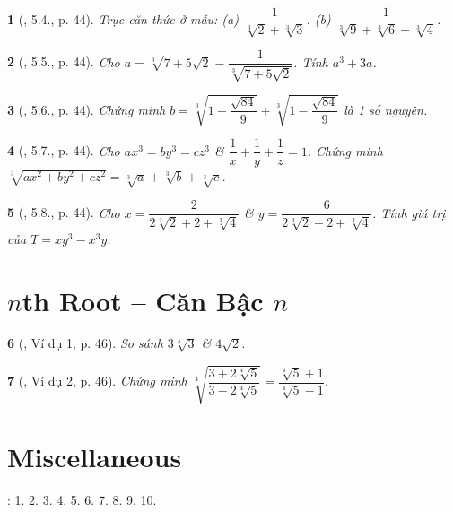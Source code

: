 \documentclass{article}
\newtheorem{baitoan}{}%
\begin{document}
\begin{baitoan}[\cite{Binh_boi_duong_Toan_9_tap_1}, 5.4., p. 44]
	Trục căn thức ở mẫu: (a) $\dfrac{1}{\sqrt[3]{2} + \sqrt[3]{3}}$. (b) $\dfrac{1}{\sqrt[3]{9} + \sqrt[3]{6} + \sqrt[3]{4}}$.
\end{baitoan}

\begin{baitoan}[\cite{Binh_boi_duong_Toan_9_tap_1}, 5.5., p. 44]
	Cho $a = \sqrt[3]{7 + 5\sqrt{2}} - \dfrac{1}{\sqrt[3]{7 + 5\sqrt{2}}}$. Tính $a^3 + 3a$.
\end{baitoan}

\begin{baitoan}[\cite{Binh_boi_duong_Toan_9_tap_1}, 5.6., p. 44]
	Chứng minh $b = \sqrt[3]{1 + \dfrac{\sqrt{84}}{9}} + \sqrt[3]{1 - \dfrac{\sqrt{84}}{9}}$ là 1 số nguyên.
\end{baitoan}

\begin{baitoan}[\cite{Binh_boi_duong_Toan_9_tap_1}, 5.7., p. 44]
	Cho $ax^3 = by^3 = cz^3$ \& $\dfrac{1}{x} + \dfrac{1}{y} + \dfrac{1}{z} = 1$. Chứng minh $\sqrt[3]{ax^2 + by^2 + cz^2} = \sqrt[3]{a} + \sqrt[3]{b} + \sqrt[3]{c}$.
\end{baitoan}

\begin{baitoan}[\cite{Binh_boi_duong_Toan_9_tap_1}, 5.8., p. 44]
	Cho $x = \dfrac{2}{2\sqrt[3]{2} + 2 + \sqrt[3]{4}}$ \& $y = \dfrac{6}{2\sqrt[3]{2} - 2 + \sqrt[3]{4}}$. Tính giá trị của $T = xy^3 - x^3y$.
\end{baitoan}


\section{$n$th Root -- Căn Bậc $n$}

\begin{baitoan}[\cite{Binh_boi_duong_Toan_9_tap_1}, Ví dụ 1, p. 46]
	So sánh $3\sqrt[4]{3}$ \& $4\sqrt{2}$.
\end{baitoan}

\begin{baitoan}[\cite{Binh_boi_duong_Toan_9_tap_1}, Ví dụ 2, p. 46]
	Chứng minh $\sqrt[4]{\dfrac{3 + 2\sqrt[4]{5}}{3 - 2\sqrt[4]{5}}} = \dfrac{\sqrt[4]{5} + 1}{\sqrt[4]{5} - 1}$.
\end{baitoan}


\section{Miscellaneous}
\cite[BTCCIII, pp. 72--73]{SGK_Toan_9_Canh_Dieu_tap_1}: 1. 2. 3. 4. 5. 6. 7. 8. 9. 10.


\printbibliography[heading=bibintoc]
\end{document}
